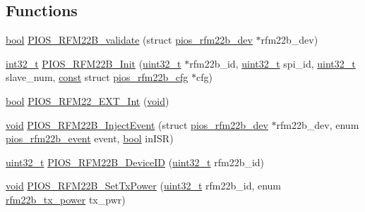 \subsection*{Functions}
\begin{DoxyCompactItemize}
\item 
\hyperlink{group___exported__types_gaf6a258d8f3ee5206d682d799316314b1}{bool} \hyperlink{group___p_i_o_s___r_f_m22_b_gadb74603103aaab46ac72a08665bf0047}{P\-I\-O\-S\-\_\-\-R\-F\-M22\-B\-\_\-validate} (struct \hyperlink{structpios__rfm22b__dev}{pios\-\_\-rfm22b\-\_\-dev} $\ast$rfm22b\-\_\-dev)
\item 
\hyperlink{group___n_a_m_e_gafd12020da5a235dfcf0c3c748fb5baed}{int32\-\_\-t} \hyperlink{group___p_i_o_s___r_f_m22_b_ga5d053a5a8be93e0b0d4c61061cc74464}{P\-I\-O\-S\-\_\-\-R\-F\-M22\-B\-\_\-\-Init} (\hyperlink{stdint_8h_a435d1572bf3f880d55459d9805097f62}{uint32\-\_\-t} $\ast$rfm22b\-\_\-id, \hyperlink{stdint_8h_a435d1572bf3f880d55459d9805097f62}{uint32\-\_\-t} spi\-\_\-id, \hyperlink{stdint_8h_a435d1572bf3f880d55459d9805097f62}{uint32\-\_\-t} slave\-\_\-num, \hyperlink{group___n_a_m_e_ga7ae6d0e43244213b34de2c2b9aa30da6}{const} struct \hyperlink{structpios__rfm22b__cfg}{pios\-\_\-rfm22b\-\_\-cfg} $\ast$cfg)
\item 
\hyperlink{group___exported__types_gaf6a258d8f3ee5206d682d799316314b1}{bool} \hyperlink{group___p_i_o_s___r_f_m22_b_ga34f82a23ad429841e5f212fc0c221131}{P\-I\-O\-S\-\_\-\-R\-F\-M22\-\_\-\-E\-X\-T\-\_\-\-Int} (\hyperlink{group___n_a_m_e_ga18028b8badbf1ea7e704ccac3c488e82}{void})
\item 
\hyperlink{group___n_a_m_e_ga18028b8badbf1ea7e704ccac3c488e82}{void} \hyperlink{group___p_i_o_s___r_f_m22_b_ga4327e22931b06353b8340bfc91abdc59}{P\-I\-O\-S\-\_\-\-R\-F\-M22\-B\-\_\-\-Inject\-Event} (struct \hyperlink{structpios__rfm22b__dev}{pios\-\_\-rfm22b\-\_\-dev} $\ast$rfm22b\-\_\-dev, enum \hyperlink{group___p_i_o_s___r_f_m22_b_gafefba9f85ea9fb8d2c610fe3759a00c2}{pios\-\_\-rfm22b\-\_\-event} event, \hyperlink{group___exported__types_gaf6a258d8f3ee5206d682d799316314b1}{bool} in\-I\-S\-R)
\item 
\hyperlink{stdint_8h_a435d1572bf3f880d55459d9805097f62}{uint32\-\_\-t} \hyperlink{group___p_i_o_s___r_f_m22_b_ga48b5ed8668584cdfbbbec3e07156e5d8}{P\-I\-O\-S\-\_\-\-R\-F\-M22\-B\-\_\-\-Device\-I\-D} (\hyperlink{stdint_8h_a435d1572bf3f880d55459d9805097f62}{uint32\-\_\-t} rfm22b\-\_\-id)
\item 
\hyperlink{group___n_a_m_e_ga18028b8badbf1ea7e704ccac3c488e82}{void} \hyperlink{group___p_i_o_s___r_f_m22_b_ga2230c70e99a4c87dcad0ea19351ddc0a}{P\-I\-O\-S\-\_\-\-R\-F\-M22\-B\-\_\-\-Set\-Tx\-Power} (\hyperlink{stdint_8h_a435d1572bf3f880d55459d9805097f62}{uint32\-\_\-t} rfm22b\-\_\-id, enum \hyperlink{group___p_i_o_s___r_f_m22_b_gaad7a4f0b388c5c9323bb4ced4e9356cc}{rfm22b\-\_\-tx\-\_\-power} tx\-\_\-pwr)

\end{DoxyCompactItemize}
